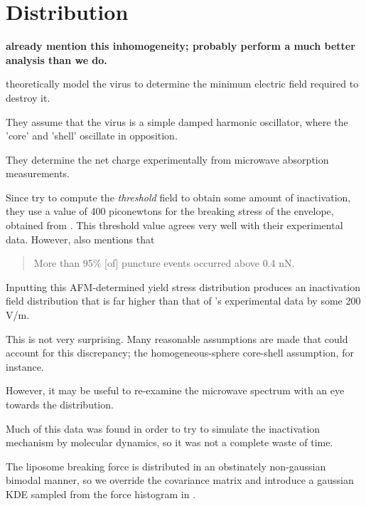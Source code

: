 \documentclass[paper.tex]{subfiles}
\begin{document}
\section{Distribution}

\begin{center}
	{\bf \cite{Microwave2009} already mention this inhomogeneity; \cite{Elastic} probably perform a much better analysis than we do.}
\end{center}
	

\cite{Efficient2015} theoretically model the virus to determine the minimum electric field required to destroy it. 

They assume that the virus is a simple damped harmonic oscillator, where the 'core' and 'shell' oscillate in opposition. 

They determine the net charge experimentally from microwave absorption measurements.



Since \cite{Efficient2015} try to compute the {\it threshold} field to obtain some amount of inactivation, they use a value of 400 piconewtons for the breaking stress of the envelope, obtained from \cite{Bending2011}. This threshold value agrees very well with their experimental data. However, \cite{Bending2011} also mentions that 

\begin{quote}
	More than 95\% [of] puncture events occurred above 0.4 nN.
\end{quote}

Inputting this AFM-determined yield stress distribution produces an inactivation field distribution that is far higher than that of \cite{Efficient2015}'s experimental data by some 200 V/m.

This is not very surprising. Many reasonable assumptions are made that could account for this discrepancy; the homogeneous-sphere core-shell assumption, for instance.

However, it may be useful to re-examine the microwave spectrum with an eye towards the distribution. 

\begin{toolchain}
Much of this data was found in order to try to simulate the inactivation mechanism by molecular dynamics, so it was not a complete waste of time.
\end{toolchain}

The liposome breaking force is distributed in an obstinately non-gaussian bimodal manner, so we override the covariance matrix and introduce a gaussian KDE sampled from the force histogram in \cite{Bending2011}.
\end{document}
